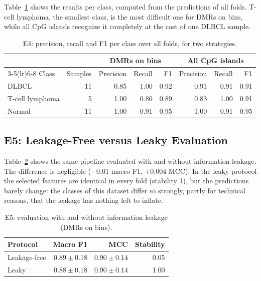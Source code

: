\documentclass[runningheads]{llncs}
\begin{document}
Table~\ref{tab:perclass} shows the results per class, computed from the predictions of all folds. T-cell lymphoma, the smallest class, is the most difficult one for DMRs on bins, while all CpG islands recognize it completely at the cost of one DLBCL sample.

\begin{table}[!htb]
\centering
\caption{E4: precision, recall and F1 per class over all folds, for two strategies.}
\label{tab:perclass}
\small
\begin{tabular}{lrrrrrrr}
\toprule
 & & \multicolumn{3}{c}{DMRs on bins} & \multicolumn{3}{c}{All CpG islands} \\
\cmidrule(lr){3-5}\cmidrule(lr){6-8}
Class & Samples & Precision & Recall & F1 & Precision & Recall & F1 \\
\midrule
DLBCL & 11 & 0.85 & 1.00 & 0.92 & 0.91 & 0.91 & 0.91 \\
T-cell lymphoma & 5 & 1.00 & 0.80 & 0.89 & 0.83 & 1.00 & 0.91 \\
Normal & 11 & 1.00 & 0.91 & 0.95 & 1.00 & 0.91 & 0.95 \\
\bottomrule
\end{tabular}
\end{table}

\subsection{E5: Leakage-Free versus Leaky Evaluation}
Table~\ref{tab:e5} shows the same pipeline evaluated with and without information leakage. The difference is negligible ($-0.01$ macro F1, $+0.004$ MCC). In the leaky protocol the selected features are identical in every fold (stability 1), but the predictions barely change: the classes of this dataset differ so strongly, partly for technical reasons, that the leakage has nothing left to inflate.

\begin{table}[!htb]
\centering
\caption{E5: evaluation with and without information leakage (DMRs on bins).}
\label{tab:e5}
\small
\begin{tabular}{lrrr}
\toprule
Protocol & Macro F1 & MCC & Stability \\
\midrule
Leakage-free & $0.89\pm0.18$ & $0.90\pm0.14$ & 0.05 \\
Leaky & $0.88\pm0.18$ & $0.90\pm0.14$ & 1.00 \\
\bottomrule
\end{tabular}
\end{table}
\end{document}
